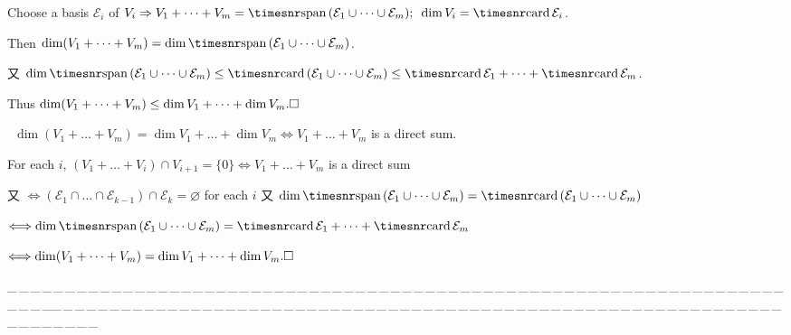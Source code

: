 \documentclass[a4paper, 11pt, UTF8]{article}
\def\card{{\timesnr\textup{card}}\,}
\def\Spn{{\timesnr\textup{span}}\,}
\def\ProblemEnding{{\tiny \_\,\_\,\_\,\_\,\_\,\_\,\_\,\_\,\_\,\_\,\_\,\_\,\_\,\_\,\_\,\_\,\_\,\_\,\_\,\_\,\_\,\_\,\_\,\_\,\_\,\_\,\_\,\_\,\_\,\_\,\_\,\_\,\_\,\_\,\_\,\_\,\_\,\_\,\_\,\_\,\_\,\_\,\_\,\_\,\_\,\_\,\_\,\_\,\_\,\_\,\_\,\_\,\_\,\_\,\_\,\_\,\_\,\_\,\_\,\_\,\_\,\_\,\_\,\_\,\_\,\_\,\_\,\_\,\_\,\_\,\_\_\,\_\,\_\,\_\,\_\,\_\,\_\,\_\,\_\,\_\,\_\,\_\,\_\,\_\,\_\,\_\,\_\,\_\,\_\,\_\,\_\,\_\,\_\,\_\,\_\,\_\,\_\,\_\,\_\,\_\,\_\,\_\,\_\,\_\,\_\,\_\,\_\,\_\,\_\,\_\,\_\,\_\,\_\,\_\,\_\,\_\,\_\,\_\,\_\,\_\,\_\,\_\,\_\,\_\,\_\,\_\,\_\,\_\,\_\,\_\,\_\,\_\,\_\,\_\,\_\,\_\,\_\,\_\,\_\,\_\,\_}}
\begin{document}
\begin{large}
\par\quad
Choose a basis $ \mathcal{E}_i$ of $V_i\Rightarrow V_1+\dots+V_m=\Spn( \mathcal{E}_1\cup\cdots\cup \mathcal{E}_m);\,\,\,\dim V_i=\card \mathcal{E}_i$.\par\quad
Then $\dim(V_1+\dots+V_m)=\dim\Spn( \mathcal{E}_1\cup\cdots\cup \mathcal{E}_m)$.\par\quad
又 $\dim\Spn(\mathcal{E}_1\cup\cdots\cup\mathcal{E}_m)\leq\card( \mathcal{E}_1\cup\cdots\cup \mathcal{E}_m)\leq\card \mathcal{E}_1+\cdots+\card \mathcal{E}_m$.\par\quad
Thus $\dim(V_1+\dots+V_m)\leq \dim V_1+\dots+\dim V_m.\hfill\square$\par\quad
\Comment \,\,\,{\timessl\Large$\dim(V_1+\dots+V_m)=\dim V_1+\dots+\dim V_m\Longleftrightarrow V_1+\dots+V_m$ is a direct sum.}\par\qquad\qquad\qquad
For each $i$, $(V_1+\dots+V_i)\cap V_{i+1}=\{0\}\Longleftrightarrow V_1+\dots+V_m$ is a direct sum\par\qquad\qquad\;\;
又 $\Longleftrightarrow(\mathcal{E}_1\cap\dots\cap\mathcal{E}_{k-1})\cap\mathcal{E}_k=\varnothing$ for each $i$ 又 $\dim\Spn(\mathcal{E}_1\cup\dots\cup\mathcal{E}_m)=\card(\mathcal{E}_1\cup\dots\cup\mathcal{E}_m)$\par\qquad\qquad\qquad
$\Longleftrightarrow\dim\Spn(\mathcal{E}_1\cup\dots\cup\mathcal{E}_m)=\card\mathcal{E}_1+\dots+\card\mathcal{E}_m$\par\qquad\qquad\qquad
$\Longleftrightarrow\dim(V_1+\dots+V_m)=\dim V_1+\dots+\dim V_m.\hfill\square$\par
\ProblemEnding\par


\end{large}
\end{document}
